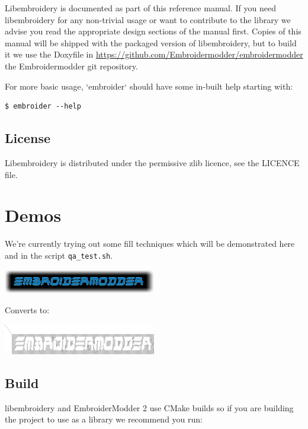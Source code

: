 \documentclass[a4paper]{report}
\begin{document}
Libembroidery is documented as part of this reference manual. If you need
libembroidery for any non-trivial usage or want to contribute to the library we
advise you read the appropriate design sections of the manual first. Copies of
this manual will be shipped with the packaged version of libembroidery, but to
build it we use the Doxyfile in
\url{https://github.com/Embroidermodder/embroidermodder} the Embroidermodder git
repository.

For more basic usage, `embroider` should have some in-built help
starting with:

\begin{lstlisting}
$ embroider --help
\end{lstlisting}

\subsection{License}

Libembroidery is distributed under the permissive zlib licence, see the LICENCE
file.

\section{Demos}

We're currently trying out some fill techniques which will be demonstrated here
and in the script \texttt{qa\_test.sh}.

\includegraphics[width=0.5\textwidth]{images/examples/logo.png}

Converts to:

\includegraphics[width=0.5\textwidth]{images/examples/crossstitch_logo.png}

\subsection{Build}

libembroidery and EmbroiderModder 2 use CMake builds
so if you are building the project to use as a library we recommend
you run:

%
\end{document}
